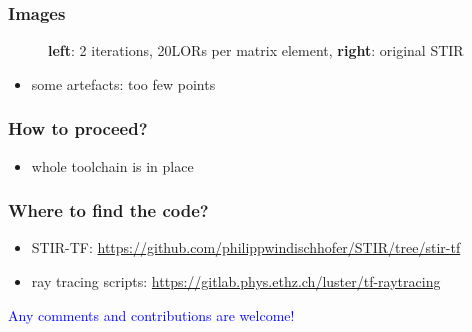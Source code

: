 \documentclass{beamer}
\begin{document}
\begin{frame}
  \frametitle{Images}
  \begin{figure}
    \centering
    \caption{\textbf{left}: 2 iterations, 20LORs per matrix element, \textbf{right}: original STIR}
  \end{figure}
  \begin{itemize}
    \item some artefacts: too few points
  \end{itemize}
\end{frame}

\begin{frame}
  \frametitle{How to proceed?}
  \begin{itemize}
    \item whole toolchain is in place
  \end{itemize}
\end{frame}

\begin{frame}
  \frametitle{Where to find the code?}
  \begin{itemize}
    \item STIR-TF: \url{https://github.com/philippwindischhofer/STIR/tree/stir-tf}
    \item ray tracing scripts: \url{https://gitlab.phys.ethz.ch/luster/tf-raytracing}
  \end{itemize}

  \begin{center}
    \textcolor{blue}{Any comments and contributions are welcome!}
  \end{center}

\end{frame}
\end{document}
